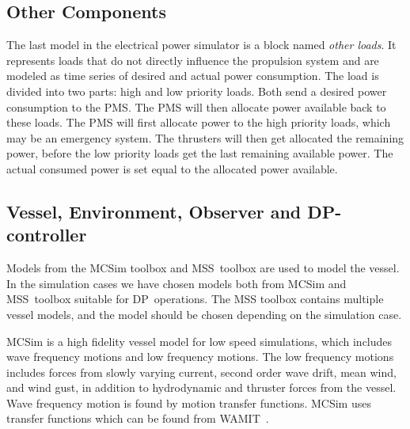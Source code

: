 \documentclass[journal]{IEEEtran}
\begin{document}
\subsection{Other Components}
The last model in the electrical power simulator is a block named \textit{other loads}.
It represents loads that do not directly influence the propulsion system and are modeled as time series of desired and actual power consumption.
The load is divided into two parts: high and low priority loads.
Both send a desired power consumption to the PMS.
The PMS will then allocate power available back to these loads.
The PMS will first allocate power to the high priority loads, which may be an emergency system.
The thrusters will then get allocated the remaining power, before the low priority loads get the last remaining available power.
The actual consumed power is set equal to the allocated power available.




\subsection{Vessel, Environment, Observer and DP-controller}
Models from the MCSim toolbox and MSS~toolbox are used to model the vessel.
In the simulation cases we have chosen models both from MCSim and MSS~toolbox suitable for DP~operations.
The MSS toolbox contains multiple vessel models, and the model should be chosen depending on the simulation case.

MCSim is a high fidelity vessel model for low speed simulations, which includes wave frequency motions and low frequency motions.
The low frequency motions includes forces from slowly varying current, second order wave drift, mean wind, and wind gust, in addition to hydrodynamic and thruster forces from the vessel.
Wave frequency motion is found by motion transfer functions.
MCSim uses transfer functions which can be found from WAMIT~\cite{wamit}.
\end{document}
